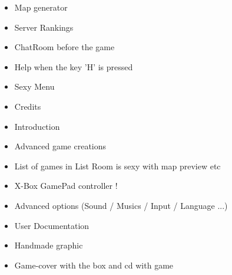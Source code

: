 \documentclass{koala-fr}
\begin{document}
\begin{itemize}
  \item Map generator
  \item Server Rankings
  \item ChatRoom before the game
  \item Help when the key 'H' is pressed
  \item Sexy Menu
  \item Credits
  \item Introduction
  \item Advanced game creations
  \item List of games in List Room is sexy with map preview etc
  \item X-Box GamePad controller !
  \item Advanced options (Sound / Musics / Input / Language ...)
  \item User Documentation
  \item Handmade graphic
  \item Game-cover with the box and cd with game
\end{itemize}
\end{document}
